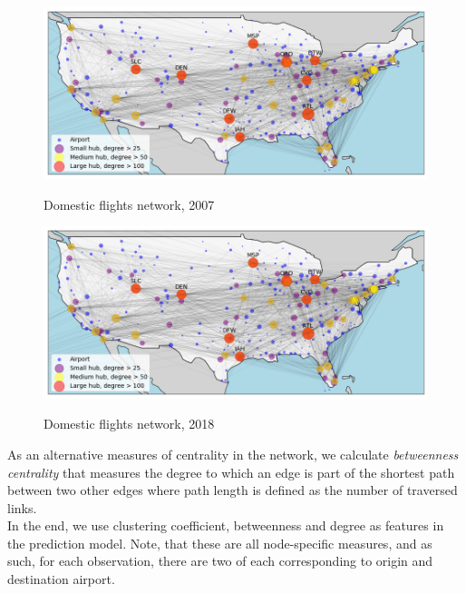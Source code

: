 \begin{figure}[H]
  \centering
  \caption{Domestic flights network, 2007}
    \includegraphics[width=1. \textwidth]{Exam/Figures/map_general_07}
    \vspace{-0.7cm}
  \label{fig:map_general_07}
\end{figure}

\begin{figure}[H]
  \centering
  \caption{Domestic flights network, 2018}
    \includegraphics[width=1. \textwidth]{Exam/Figures/map_general_07}
    \vspace{-0.7cm}
  \label{fig:map_general_07}
\end{figure}

As an alternative measures of centrality in the network, we calculate \textit{betweenness centrality} that measures the degree to which an edge is part of the shortest path between two other edges where path length is defined as the number of traversed links. \\
In the end, we use clustering coefficient, betweenness and degree as features in the prediction model. Note, that these are all node-specific measures, and as such, for each observation, there are two of each corresponding to origin and destination airport. 

